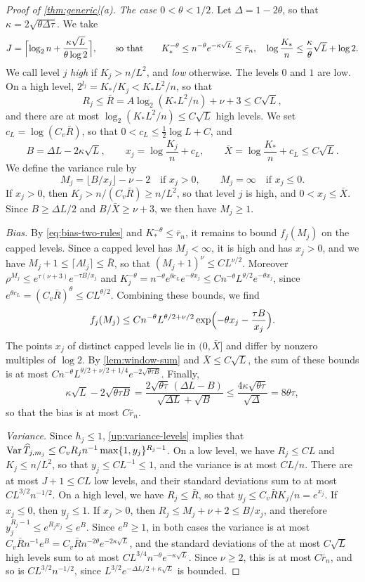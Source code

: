 \begin{proof}[Proof of \cref{thm:generic}(a)]
\emph{The case $0<\theta<1/2$.} Let $\Delta=1-2\theta$, so that
$\kappa=2\sqrt{\theta\Delta\tau}$. We take
\[
 J=\Bigl\lceil\log_2n+\frac{\kappa\sqrt L}{\theta\log2}\Bigr\rceil,
 \qquad\text{so that}\qquad
 K_*^{-\theta}\le n^{-\theta}e^{-\kappa\sqrt L}\le\bar r_n,
 \quad\log\frac{K_*}n\le\frac\kappa\theta\sqrt L+\log2.
\]
We call level $j$ \emph{high} if $K_j>n/L^2$, and \emph{low} otherwise.
The levels $0$ and $1$ are low. On a high level,
$2^{l_j}=K_*/K_j<K_*L^2/n$, so that
\[
 R_j\le\bar R=A\log_2(K_*L^2/n)+\nu+3\le C\sqrt L,
\]
and there are at most $\log_2(K_*L^2/n)\le C\sqrt L$ high levels. We set
$c_L=\log(C_v\bar R)$, so that $0<c_L\le\frac12\log L+C$, and
\[
 B=\Delta L-2\kappa\sqrt L,\qquad
 x_j=\log\frac{K_j}n+c_L,\qquad
 \bar X=\log\frac{K_*}n+c_L\le C\sqrt L.
\]
We define the variance rule by
\[
 M_j=\lfloor B/x_j\rfloor-\nu-2\quad\text{if }x_j>0,\qquad
 M_j=\infty\quad\text{if }x_j\le0.
\]
If $x_j>0$, then $K_j>n/(C_v\bar R)\ge n/L^2$, so that level $j$ is high,
and $0<x_j\le\bar X$. Since $B\ge\Delta L/2$ and $B/\bar X\ge\nu+3$, we
then have $M_j\ge1$.

\emph{Bias.} By \eqref{eq:bias-two-rules} and $K_*^{-\theta}\le\bar r_n$,
it remains to bound $f_j(M_j)$ on the capped levels. Since a capped
level has $M_j<\infty$, it is high and has $x_j>0$, and we have
$M_j+1\le\lceil Al_j\rceil\le\bar R$, so that $(M_j+1)^\nu\le CL^{\nu/2}$.
Moreover $\rho^{M_j}\le e^{\tau(\nu+3)}e^{-\tau B/x_j}$ and
$K_j^{-\theta}=n^{-\theta}e^{\theta c_L}e^{-\theta x_j}
\le Cn^{-\theta}L^{\theta/2}e^{-\theta x_j}$, since
$e^{\theta c_L}=(C_v\bar R)^\theta\le CL^{\theta/2}$. Combining these
bounds, we find
\[
 f_j(M_j)\le Cn^{-\theta}L^{\theta/2+\nu/2}
     \exp\Bigl(-\theta x_j-\frac{\tau B}{x_j}\Bigr).
\]
The points $x_j$ of distinct capped levels lie in $(0,\bar X]$ and differ
by nonzero multiples of $\log2$. By \cref{lem:window-sum} and
$\bar X\le C\sqrt L$, the sum of these bounds is at most
$Cn^{-\theta}L^{\theta/2+\nu/2+1/4}e^{-2\sqrt{\theta\tau B}}$. Finally,
\[
 \kappa\sqrt L-2\sqrt{\theta\tau B}
 =\frac{2\sqrt{\theta\tau}\,(\Delta L-B)}{\sqrt{\Delta L}+\sqrt B}
 \le\frac{4\kappa\sqrt{\theta\tau}}{\sqrt\Delta}=8\theta\tau,
\]
so that the bias is at most $C\bar r_n$.

\emph{Variance.} Since $h_j\le1$, \eqref{up:variance-levels} implies that
$\operatorname{Var}\widehat T_{j,m_j}\le C_vR_jn^{-1}\max\{1,y_j\}^{R_j-1}$. On a low
level, we have $R_j\le CL$ and $K_j\le n/L^2$, so that $y_j\le CL^{-1}\le1$,
and the variance is at most $CL/n$. There are at most $J+1\le CL$ low
levels, and their standard deviations sum to at most $CL^{3/2}n^{-1/2}$.
On a high level, we have $R_j\le\bar R$, so that
$y_j\le C_v\bar RK_j/n=e^{x_j}$. If $x_j\le0$, then $y_j\le1$. If
$x_j>0$, then $R_j\le M_j+\nu+2\le B/x_j$, and therefore
$y_j^{R_j-1}\le e^{R_jx_j}\le e^B$. Since $e^B\ge1$, in both cases the
variance is at most
$C_v\bar Rn^{-1}e^B=C_v\bar Rn^{-2\theta}e^{-2\kappa\sqrt L}$, and the
standard deviations of the at most $C\sqrt L$ high levels sum to at most
$CL^{3/4}n^{-\theta}e^{-\kappa\sqrt L}$. Since $\nu\ge2$, this is at most
$C\bar r_n$, and so is $CL^{3/2}n^{-1/2}$, since
$L^{3/2}e^{-\Delta L/2+\kappa\sqrt L}$ is bounded.


\end{proof}
